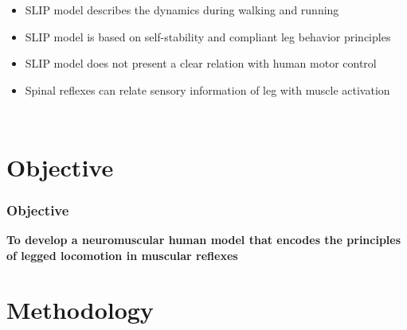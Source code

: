 \documentclass[10pt]{beamer}
\begin{document}
\begin{frame}
\begin{columns}
			\begin{itemize}
				\item SLIP model describes the dynamics during walking and running\footnotemark[1] \\[1em]
				\item SLIP model is based on self-stability and compliant leg behavior principles\footnotemark[2] \\[1em]
				\item SLIP model does not present a clear relation with human motor control\footnotemark[2] \\[1em]	
				\item Spinal reflexes can relate sensory information of leg with muscle activation\footnotemark[2]
			\end{itemize}
		\end{columns}
	\end{frame}
	
	
	\section{Objective}	
	\begin{frame}
		\frametitle{Objective}
		\centering
		\LARGE
		\bf
		To develop a neuromuscular human model that encodes the principles of legged locomotion in muscular reflexes
	\end{frame}
	
	\section{Methodology}
\end{document}
